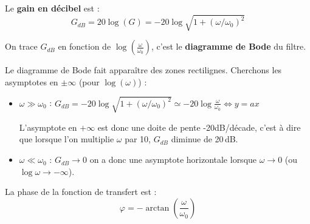 \documentclass{cours}
\begin{document}
Le \textbf{gain en décibel} est :
\begin{equation*}
G_{dB}=20\log(G) = -20\log\sqrt{1+(\omega/\omega_0)^2}
\end{equation*}

On trace $G_{dB}$ en fonction de $\log\left(\frac{\omega}{\omega_0}\right)$, c'est le \textbf{diagramme de Bode} du filtre.

\begin{center}
\end{center}

Le diagramme de Bode fait apparaître des zones rectilignes. Cherchons les asymptotes en $\pm\infty$ (pour $\log(\omega)$) :
\begin{itemize}
\item $\omega\gg\omega_0$ : $G_{dB}=-20\log\sqrt{1+(\omega/\omega_0)^2}\simeq -20\log \frac{\omega}{\omega_0} \Leftrightarrow y=ax$

L'asymptote en $+\infty$ est donc une doite de pente -20dB/décade, c'est à dire que lorsque l'on multiplie $\omega$ par 10, $G_{dB}$ diminue de 20\,dB.

\item $\omega\ll\omega_0$ : $G_{dB}\rightarrow 0$ on a donc une asymptote horizontale lorsque $\omega\rightarrow 0$ (ou $\log\omega\rightarrow -\infty$).
\end{itemize}

La phase de la fonction de transfert est :
\[\varphi = -\arctan\left(\frac{\omega}{\omega_0}\right) \]
\end{document}
